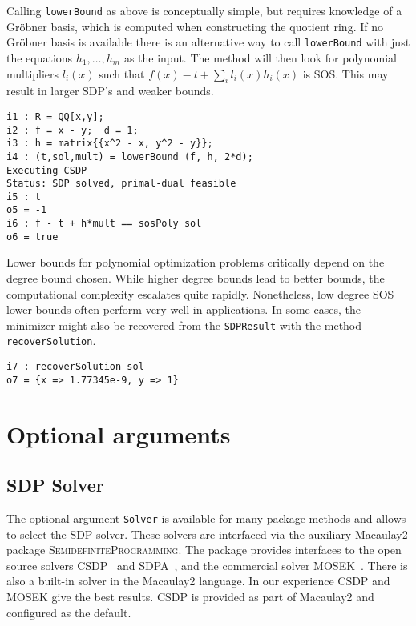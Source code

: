 \documentclass[11pt]{amsart}
\theoremstyle{plain}%
\theoremstyle{definition}
\theoremstyle{remark}
\newcommand{\Mac}{Macaulay2\xspace}
\newcommand{\SDP}{\textsc{SemidefiniteProgramming}\xspace}
\begin{document}
Calling \verb|lowerBound| as above is conceptually simple, but requires knowledge of a Gröbner basis, which is computed when constructing the quotient ring.
If no Gröbner basis is available there is an alternative way to call \verb|lowerBound| with just the equations $h_1,\dots,h_m$ as the input.
The method will then look for polynomial multipliers $l_i(x)$ such that $f(x) - t + \sum_i l_i(x)h_i(x)$ is SOS.
This may result in larger SDP's and weaker bounds.

{\small
\begin{verbatim}
i1 : R = QQ[x,y];
i2 : f = x - y;  d = 1;
i3 : h = matrix{{x^2 - x, y^2 - y}};
i4 : (t,sol,mult) = lowerBound (f, h, 2*d);
Executing CSDP
Status: SDP solved, primal-dual feasible
i5 : t
o5 = -1
i6 : f - t + h*mult == sosPoly sol
o6 = true
\end{verbatim}
}

Lower bounds for polynomial optimization problems critically depend on the degree bound chosen.
While higher degree bounds lead to better bounds, the computational complexity escalates quite rapidly.
Nonetheless, low degree SOS lower bounds often perform very well in applications.
In some cases, the minimizer might also be recovered from the \verb|SDPResult| with the method \verb|recoverSolution|.

{\small
\begin{verbatim}
i7 : recoverSolution sol
o7 = {x => 1.77345e-9, y => 1}
\end{verbatim}
}

\section{Optional arguments}
\label{s:arguments}

\subsection*{SDP Solver}
The optional argument \verb|Solver| is available for many package methods and allows to select the SDP solver.
These solvers are interfaced via the auxiliary Macaulay2 package \SDP.
The package provides interfaces to the open source solvers CSDP~\cite{borchers1999csdp} and SDPA~\cite{yamashita2003implementation}, and the commercial solver MOSEK~\cite{mosek}.
There is also a built-in solver in the \Mac language.
In our experience CSDP and MOSEK give the best results.
CSDP is provided as part of \Mac and configured as the default.
\end{document}
